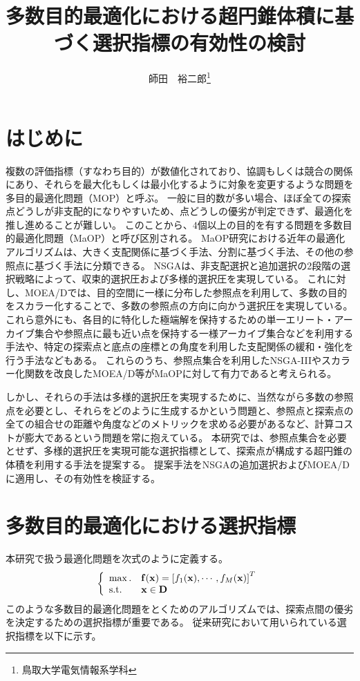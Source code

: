 \documentclass[10pt, a4paper, titlepage]{jarticle}
\title{多数目的最適化における超円錐体積に基づく選択指標の有効性の検討}
\author{師田　裕二郎\thanks{鳥取大学電気情報系学科}}
\begin{document}
 
\maketitle
\section{はじめに}
複数の評価指標（すなわち目的）が数値化されており、協調もしくは競合の関係にあり、それらを最大化もしくは最小化するように対象を変更するような問題を多目的最適化問題（MOP）と呼ぶ。
一般に目的数が多い場合、ほぼ全ての探索点どうしが非支配的になりやすいため、点どうしの優劣が判定できず、最適化を推し進めることが難しい。
このことから、$4$個以上の目的を有する問題を多数目的最適化問題（MaOP）と呼び区別される。
MaOP研究における近年の最適化アルゴリズムは、大きく支配関係に基づく手法、分割に基づく手法、その他の参照点に基づく手法に分類できる。
NSGAは、非支配選択と追加選択の2段階の選択戦略によって、収束的選択圧および多様的選択圧を実現している。
これに対し、MOEA/Dでは、目的空間に一様に分布した参照点を利用して、多数の目的をスカラー化することで、多数の参照点の方向に向かう選択圧を実現している。
これら意外にも、各目的に特化した極端解を保持するための単一エリート・アーカイブ集合や参照点に最も近い点を保持する一様アーカイブ集合などを利用する手法や、特定の探索点と底点の座標との角度を利用した支配関係の緩和・強化を行う手法などもある。
これらのうち、参照点集合を利用したNSGA-IIIやスカラー化関数を改良したMOEA/D等がMaOPに対して有力であると考えられる。

しかし、それらの手法は多様的選択圧を実現するために、当然ながら多数の参照点を必要とし、それらをどのように生成するかという問題と、参照点と探索点の全ての組合せの距離や角度などのメトリックを求める必要があるなど、計算コストが膨大であるという問題を常に抱えている。
本研究では、参照点集合を必要とせず、多様的選択圧を実現可能な選択指標として、探索点が構成する超円錐の体積を利用する手法を提案する。
提案手法をNSGAの追加選択およびMOEA/Dに適用し、その有効性を検証する。

\newpage
\section{多数目的最適化における選択指標}

本研究で扱う最適化問題を次式のように定義する。
\begin{equation}
\left\{
\begin{array}{ll}
\max.& {\bf f}({\bf x}) = \left[ f_1({\bf x}), \cdots, f_M({\bf x})  \right]^T
\\
{\rm s.t.}& {\bf x} \in {\bf D}
\end{array}
\right.
\end{equation}
このような多数目的最適化問題をとくためのアルゴリズムでは、探索点間の優劣を決定するための選択指標が重要である。
従来研究において用いられている選択指標を以下に示す。
\end{document}
